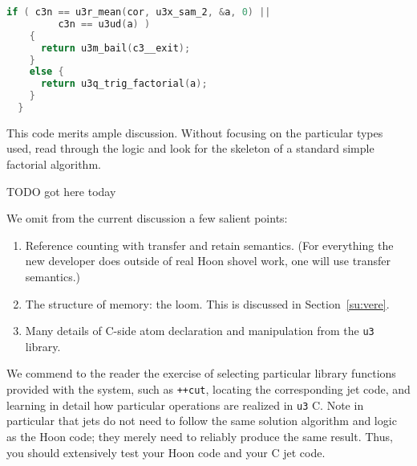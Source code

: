 \begin{example}
\begin{lstlisting}[language=C,
                   caption={\texttt{pkg/urbit/jets/e/trig.c}}]
    if ( c3n == u3r_mean(cor, u3x_sam_2, &a, 0) ||
         c3n == u3ud(a) )
    {
      return u3m_bail(c3__exit);
    }
    else {
      return u3q_trig_factorial(a);
    }
  }
\end{lstlisting}

This code merits ample discussion.  Without focusing on the particular types used, read through the logic and look for the skeleton of a standard simple factorial algorithm.

TODO got here today


We omit from the current discussion a few salient points:

\begin{enumerate}
  \item  Reference counting with transfer and retain semantics.  (For everything the new developer does outside of real Hoon shovel work, one will use transfer semantics.)
  \item  The structure of memory:  the loom.  This is discussed in Section~\ref{su:vere}.
  \item  Many details of C-side atom declaration and manipulation from the \texttt{u3} library.
\end{enumerate}

We commend to the reader the exercise of selecting particular library functions provided with the system, such as \texttt{++cut}, locating the corresponding jet code, and learning in detail how particular operations are realized in \texttt{u3} C.  Note in particular that jets do not need to follow the same solution algorithm and logic as the Hoon code; they merely need to reliably produce the same result.  Thus, you should extensively test your Hoon code and your C jet code.


\end{example}
